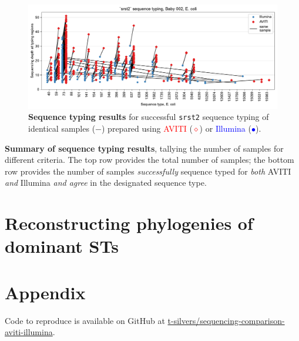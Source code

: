 \documentclass{article}
\begin{document}
\begin{figure}[!h]
    \centering
    \includegraphics[width=.95\textwidth]{figures/sequence_typing.pdf}
    \caption{
        \textbf{Sequence typing results} for successful \texttt{srst2} sequence typing of identical samples ($-$) 
        prepared using \textcolor{red}{AVITI} (\textcolor{red}{$\diamond$}) or \textcolor{blue}{Illumina} (\textcolor{blue}{$\bullet$}).
    }
    \label{figure:st}
\end{figure}

\begin{table}[h]
    \centering
    
    \caption{
        \textbf{Summary of sequence typing results}, tallying the number of samples for different criteria. 
        The top row provides the total number of samples; 
        the bottom row provides the number of samples \textit{successfully} sequence typed for \textit{both} AVITI \textit{and} Illumina 
        \textit{and agree} in the designated sequence type.
    }
    \label{tab:st}
\end{table}


\section{Reconstructing phylogenies of dominant STs}

\section{Appendix}

Code to reproduce is available on GitHub at \href{https://github.com/t-silvers/sequencing-comparison-aviti-illumina}{t-silvers/sequencing-comparison-aviti-illumina}.
\end{document}

